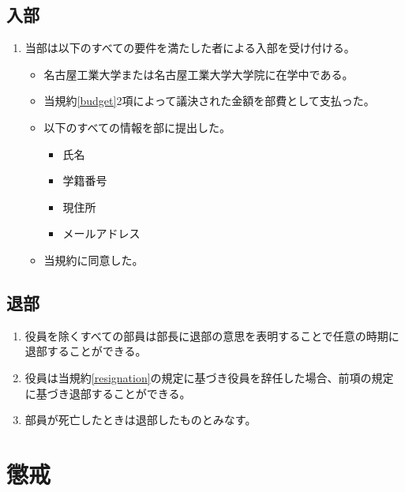 \documentclass[12pt, unicode, a4paper]{ltjsreport}
\begin{document}
    \section{入部}
        \begin{enumerate}
            \item 当部は以下のすべての要件を満たした者による入部を受け付ける。
            \begin{itemize}
                \item 名古屋工業大学または名古屋工業大学大学院に在学中である。
                \item 当規約\ref{budget}2項によって議決された金額を部費として支払った。
                \item 以下のすべての情報を部に提出した。
                \begin{itemize}
                    \item 氏名
                    \item 学籍番号
                    \item 現住所
                    \item メールアドレス
                \end{itemize}
                \item 当規約に同意した。
            \end{itemize}
        \end{enumerate}

    \section{退部}
        \begin{enumerate}
            \item 役員を除くすべての部員は部長に退部の意思を表明することで任意の時期に退部することができる。
            \item 役員は当規約\ref{resignation}の規定に基づき役員を辞任した場合、前項の規定に基づき退部することができる。
            \item 部員が死亡したときは退部したものとみなす。
        \end{enumerate}


\chapter{懲戒}
\end{document}
